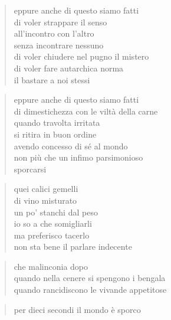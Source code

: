 	\begin{verse}
		eppure anche di questo siamo fatti\\
		di voler strappare il senso\\
		all'incontro con l'altro\\
		senza incontrare nessuno\\
		di voler chiudere nel pugno il mistero\\
		di voler fare autarchica norma\\
		il bastare a noi stessi
	\end{verse}

	\begin{verse}
		eppure anche di questo siamo fatti\\
		di dimestichezza con le viltà della carne\\
		quando travolta irritata\\
		si ritira in buon ordine\\
		avendo concesso di sé al mondo\\
		non più che un infimo parsimonioso\\
		sporcarsi
	\end{verse}

\clearpage


\vspace*{2cm}

	\begin{verse}
		quei calici gemelli\\
		di vino misturato\\
		un po' stanchi dal peso\\
		io so a che somigliarli\\
		ma preferisco tacerlo\\
		non sta bene il parlare indecente
	\end{verse}

\clearpage


\vspace*{2cm}

	\begin{verse}
		che malinconia dopo\\
		quando nella cenere si spengono i bengala\\
		quando rancidiscono le vivande appetitose
	\end{verse}

	\begin{verse}
		per dieci secondi il mondo è sporco
	\end{verse}

